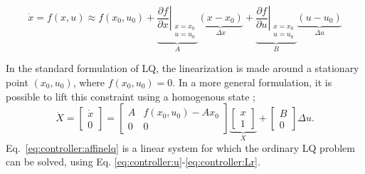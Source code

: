     \begin{equation}
        \label{eq:controller:gainscheduling:xdot}
        \dot{x} = f(x,u) \approx f(x_{0},u_{0})
            + \underbrace{\left. \frac{\partial f}{\partial x} \right|_{
                \begin{array}{l}
                    x=x_{0} \\
                    u=u_{0}
                \end{array}
            }}_{A}
                \underbrace{\left( x-x_{0} \right)}_{\Delta x}
            + \underbrace{\left. \frac{\partial f}{\partial u} \right|_{
                \begin{array}{l}
                    x=x_{0} \\
                    u=u_{0}
                \end{array}
            }}_{B}
                \underbrace{\left( u-u_{0} \right)}_{\Delta u}
    \end{equation}

    In the standard formulation of LQ, the linearization is made
    around a stationary point $(x_{0},u_{0})$, where $f(x_{0},u_{0}) = 0$.
    In a more general formulation, it is possible to lift this constraint
    using a homogenous state \citep{Rantzer99piecewiselinear};
    \begin{equation}
    \label{eq:controller:affinelq}
        \dot{X} = \left[
        \begin{array}{c}
            \dot{x} \\
            0
        \end{array}\right] =
        \left[
        \begin{array}{cc}
            A & f(x_{0},u_{0})-Ax_{0} \\
            0 & 0
        \end{array}\right]
        \underbrace{\left[
        \begin{array}{c}
            x \\
            1
        \end{array}\right]}_{X}
        +
        \left[
        \begin{array}{c}
            B \\
            0
        \end{array}\right]
        \Delta u.
    \end{equation}
    Eq.~\ref{eq:controller:affinelq} is a linear system for which
    the ordinary LQ problem can be solved, using Eq.
    \eqref{eq:controller:u}-\eqref{eq:controller:Lr}.

